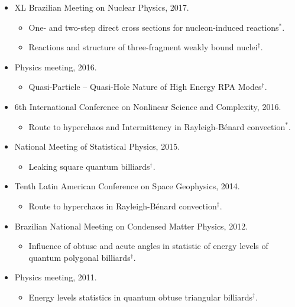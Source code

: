 \documentclass[12pt,a4paper,sans]{moderncv}
\begin{document}
{\begin{itemize}
\begin{itemize}
     \end{itemize}
   \item XL Brazilian Meeting on Nuclear Physics, 2017.
     \begin{itemize}
      \item One- and two-step direct cross sections for nucleon-induced reactions$^{*}$.
      \item Reactions and structure of three-fragment weakly bound nuclei$^{\dagger}$.
     \end{itemize}
   \item Physics meeting, 2016.
     \begin{itemize}
     \item Quasi-Particle -- Quasi-Hole Nature of High Energy RPA Modes$^{\dagger}$.
     \end{itemize}
   \item 6th International Conference on Nonlinear Science and Complexity, 2016.
    \begin{itemize}
     \item Route to hyperchaos and Intermittency in Rayleigh-B{\'e}nard convection$^{*}$.
     \end{itemize}
   \item National Meeting of Statistical Physics, 2015.
     \begin{itemize}
     \item Leaking square quantum billiards$^{\dagger}$.
     \end{itemize}
   \item Tenth Latin American Conference on Space Geophysics, 2014.
     \begin{itemize}
     \item Route to hyperchaos in Rayleigh-B{\'e}nard convection$^{\dagger}$.
     \end{itemize}
   \item Brazilian National Meeting on Condensed Matter Physics, 2012.
     \begin{itemize}
     \item Influence of obtuse and acute angles in statistic of energy levels of quantum polygonal billiards$^{\dagger}$.
     \end{itemize}
   \item Physics meeting, 2011.
     \begin{itemize}
     \item Energy levels statistics in quantum obtuse triangular billiards$^{\dagger}$.
    \end{itemize}
  \end{itemize}
}
\end{document}
